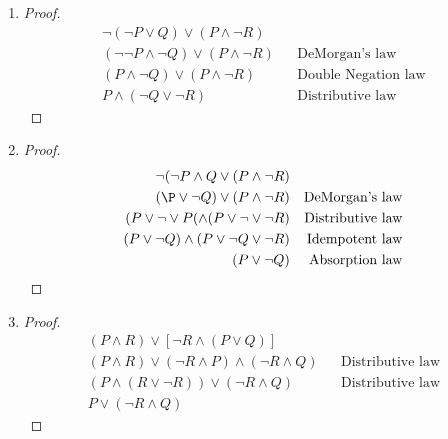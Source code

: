     \begin{solution}
        \begin{enumerate}[label=(\alph*)]
            \item {
                \begin{proof}
                    \begin{align*}
                        \neg(\neg P \vee Q) \vee (P \wedge \neg R) \\
                        (\neg\neg P \wedge \neg Q) \vee (P \wedge \neg R) && \text{DeMorgan's law} \\
                        (P \wedge \neg Q) \vee (P \wedge\neg R) && \text{Double Negation law} \\
                        P \wedge (\neg Q \vee \neg R) && \text{Distributive law}
                    \end{align*}
                \end{proof}
            }
            
            \item {
                \begin{proof}
                    \begin{align*}
                        \neg(\neg P \wedge Q \vee (P \wedge \neg R) \\
                        (\P \vee \neg Q) \vee (P \wedge \neg R) && \text{DeMorgan's law} \\
                        (P \vee \neg \vee P( \wedge ( P \vee \neg \vee \neg R) && \text{Distributive law} \\
                        (P \vee \neg Q) \wedge (P \vee \neg Q \vee \neg R) && \text{Idempotent law} \\
                        (P \vee \neg Q) && \text{Absorption law}
                    \end{align*}
                \end{proof}
            }
            
            \item {
                \begin{proof}
                    \begin{align*}
                        (P \wedge R) \vee [\neg R \wedge (P \vee Q)] \\
                        (P \wedge R) \vee (\neg R \wedge P) \wedge (\neg R \wedge Q) && \text{Distributive law} \\
                        (P \wedge (R \vee \neg R)) \vee (\neg R \wedge Q) && \text{Distributive law} \\
                        P \vee (\neg R \wedge Q)
                    \end{align*}
                \end{proof}
            }
        \end{enumerate}
    \end{solution}

